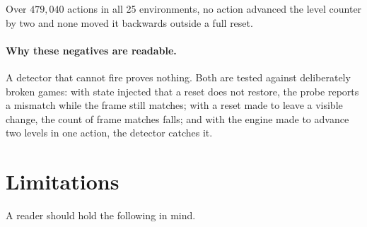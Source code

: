 \documentclass[11pt]{article}
\begin{document}
Over $479{,}040$ actions in all 25 environments, no action advanced the level
counter by two and none moved it backwards outside a full reset.

\paragraph{Why these negatives are readable.} A detector that cannot fire proves
nothing. Both are tested against deliberately broken games: with state injected
that a reset does not restore, the probe reports a mismatch while the frame
still matches; with a reset made to leave a visible change, the count of frame
matches falls; and with the engine made to advance two levels in one action, the
detector catches it.

\section{Limitations}

A reader should hold the following in mind.
\end{document}
